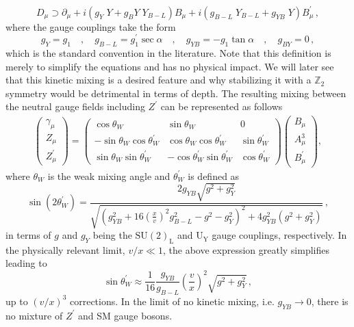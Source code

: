 \documentclass[10pt]{report}
\begin{document}
\begin{equation}
D_\mu \supset \partial_\mu + i \left(g_Y \; Y + g_BY \; Y_{B-L}\right) B_\mu + i \left(g_{B-L} \; Y_{B-L} + g_{YB} \; Y\right) B_\mu^\prime\,,
\label{eq:newCov}
\end{equation}	
where the gauge couplings take the form
\begin{equation}
g_Y = g_1 \quad , \quad 
g_{B-L} = g_1^\prime \sec \alpha   \quad , \quad 
g_{YB} = -g_1 \tan \alpha  \quad , \quad 
g_{BY} = 0 \,,  
\label{eq:new-g-simp}
\end{equation}
%
which is the standard convention in the literature.
%
Note that this definition is merely to simplify the equations and has no physical impact. 
%
We will later see that this kinetic mixing is a desired feature and why stabilizing it with a $\mathbb{Z}_2$ symmetry would be detrimental in terms of depth.
%
The resulting mixing between the neutral gauge fields including $Z^\prime$ can be represented as follows
%
\begin{equation}
\begin{aligned}
\begin{pmatrix}
\gamma_\mu \\
Z_\mu \\
Z^\prime_\mu
\end{pmatrix}
=
\begin{pmatrix}
\cos \theta_W & \sin \theta_W & 0\\
-\sin \theta_W \cos \theta_W^\prime & \cos \theta_W \cos \theta_W^\prime & \sin \theta_W^\prime \\
\sin \theta_W \sin \theta_W^\prime & -\cos \theta_W^\prime \sin \theta_W^\prime & \cos \theta_W^\prime
\end{pmatrix}
\begin{pmatrix}
B_\mu \\
A^3_\mu \\
B^\prime_\mu
\end{pmatrix} , 
\end{aligned}
\label{eq:g-Z-Zp}
\end{equation}
%
where $\theta_W$ is the weak mixing angle and $\theta^\prime_W$ is defined as
\begin{equation}
\sin(2 \theta^\prime_W) = \frac{2 g_{YB} \sqrt{g^2 + g_{Y}^2}}{\sqrt{(g_{YB}^2 + 16 (\frac{x}{v})^2 g_{B-L}^2 - g^2 - g_{Y}^2)^2 + 4 g_{YB}^2 (g^2 + g_{Y}^2)} }\,,
\label{eq:theta-p-full}
\end{equation}
%
in terms of $g$ and $g_{Y}$ being the $\mathrm{SU(2)_{L}}$ and $\mathrm{U_{Y}}$ gauge couplings, respectively. In the physically relevant limit, $v/x \ll 1$, the above expression greatly simplifies leading to
%
\begin{equation}
\sin \theta_W^\prime \approx \dfrac{1}{16
} \dfrac{g_{YB}}{g_{B-L}}\left( \dfrac{v}{x} \right)^2 \sqrt{g^2 + g_{Y}^2} \,,
\label{eq:theta-p}
\end{equation}
%
up to $(v/x)^3$ corrections. In the limit of no kinetic mixing, i.e. $g_{YB} \to 0$, there is no mixture of $Z^\prime$ and SM gauge bosons. 
\end{document}
